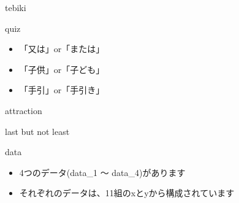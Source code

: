 \documentclass[
  ignorenonframetext,
]{beamer}
\providecommand{\tightlist}{%
  \setlength{\itemsep}{0pt}\setlength{\parskip}{0pt}}
\begin{document}
\begin{frame}{tebiki}
\protect\hypertarget{tebiki-1}{}
\vspace*{-20pt}
\end{frame}

\begin{frame}{quiz}
\protect\hypertarget{quiz}{}
\Huge

\begin{itemize}[<+->]
\tightlist
\item
  「又は」or「または」 \bigskip
\item
  「子供」or「子ども」 \bigskip
\item
  「手引」or「手引き」
\end{itemize}
\end{frame}

\begin{frame}{attraction}
\protect\hypertarget{attraction}{}
\vspace*{-4pt}
\end{frame}

\begin{frame}{last but not least}
\protect\hypertarget{last-but-not-least}{}
\end{frame}

\begin{frame}{data}
\protect\hypertarget{data}{}
\begin{itemize}[<+->]
\item
  4つのデータ(data\_1 ～ data\_4)があります
\item
  それぞれのデータは、11組のxとyから構成されています
\end{itemize}
\end{frame}
\end{document}

